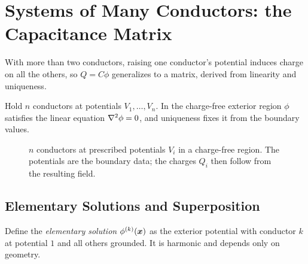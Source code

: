 \section{Systems of Many Conductors: the Capacitance Matrix}

With more than two conductors, raising one conductor's potential induces charge on all the others, so $Q=C\phi$ generalizes to a matrix, derived from linearity and uniqueness.

Hold $n$ conductors at potentials $V_1,\dots,V_n$. In the charge-free exterior region $\phi$ satisfies the linear equation $\laplacian\phi=0$, and uniqueness fixes it from the boundary values.

\begin{figure}[H]
\begin{center}
\end{center}
\caption{$n$ conductors at prescribed potentials $V_i$ in a charge-free region. The potentials are the boundary data; the charges $Q_i$ then follow from the resulting field.}
\label{fig:em-nconductors}
\end{figure}

\subsection{Elementary Solutions and Superposition}

Define the \emph{elementary solution} $\phi^{(k)}(\bm{x})$ as the exterior potential with conductor $k$ at potential $1$ and all others grounded. It is harmonic and depends only on geometry.

